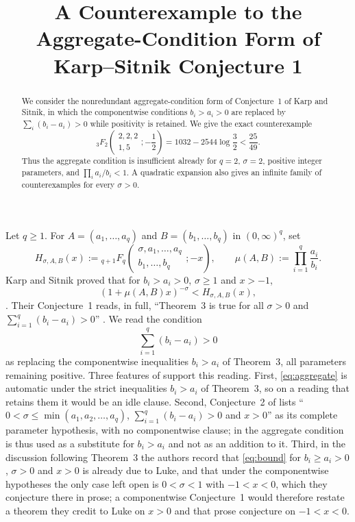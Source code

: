 \documentclass[11pt]{amsart}
\title{A Counterexample to the Aggregate-Condition Form of
Karp--Sitnik Conjecture 1}
\date{}
\begin{document}
\begin{abstract}
We consider the nonredundant aggregate-condition form of Conjecture~1 of
Karp and Sitnik, in which the componentwise conditions $b_i>a_i>0$ are
replaced by $\sum_i(b_i-a_i)>0$ while positivity is retained. We give the
exact counterexample
\[
 {}_3F_2\!\left(
 \begin{matrix}2,2,2\\1,5\end{matrix};-\frac12
 \right)
 =1032-2544\log\frac32<\frac{25}{49}.
\]
Thus the aggregate condition is insufficient already for $q=2$, $\sigma=2$,
positive integer parameters, and $\prod_i a_i/b_i<1$. A quadratic expansion
also gives an infinite family of counterexamples for every $\sigma>0$.
\end{abstract}

\maketitle

Let $q\ge1$. For $A=(a_1,\ldots,a_q)$ and $B=(b_1,\ldots,b_q)$ in
$(0,\infty)^q$, set
\[
 H_{\sigma,A,B}(x)
 :=
 {}_{q+1}F_q\!\left(
 \begin{matrix}
 \sigma,a_1,\ldots,a_q\\
 b_1,\ldots,b_q
 \end{matrix};-x
 \right),
 \qquad
 \mu(A,B):=\prod_{i=1}^q\frac{a_i}{b_i}.
\]
Karp and Sitnik proved that for $b_i>a_i>0$, $\sigma\ge1$ and $x>-1$,
\begin{equation}\label{eq:bound}
 (1+\mu(A,B)x)^{-\sigma}<H_{\sigma,A,B}(x),
\end{equation}
\cite[Theorem~3]{KS}. Their Conjecture~1 reads, in full, ``Theorem~3 is
true for all $\sigma>0$ and $\sum_{i=1}^{q}(b_i-a_i)>0$''
\cite[Conjecture~1]{KS}. We read the condition
\begin{equation}\label{eq:aggregate}
 \sum_{i=1}^q(b_i-a_i)>0
\end{equation}
as replacing the componentwise inequalities $b_i>a_i$ of Theorem~3, all
parameters remaining positive. Three features of \cite{KS} support this
reading. First, \eqref{eq:aggregate} is automatic under the strict
inequalities $b_i>a_i$ of Theorem~3, so on a reading that retains them it
would be an idle clause. Second, Conjecture~2
of \cite{KS} lists ``$0<\sigma\le\min(a_1,a_2,\ldots,a_q)$,
$\sum_{i=1}^{q}(b_i-a_i)>0$ and $x>0$'' as its complete parameter
hypothesis, with no componentwise clause; in \cite{KS} the aggregate
condition is thus used as a substitute for $b_i>a_i$ and not as an addition
to it. Third, in the discussion following Theorem~3 the authors record that
\eqref{eq:bound} for $b_i\ge a_i>0$, $\sigma>0$ and $x>0$ is already due to
Luke, and that under the componentwise hypotheses the only case left open
is $0<\sigma<1$ with $-1<x<0$, which they conjecture there in prose; a
componentwise Conjecture~1 would therefore restate a theorem they credit to
Luke on $x>0$ and that prose conjecture on $-1<x<0$.
\end{document}
